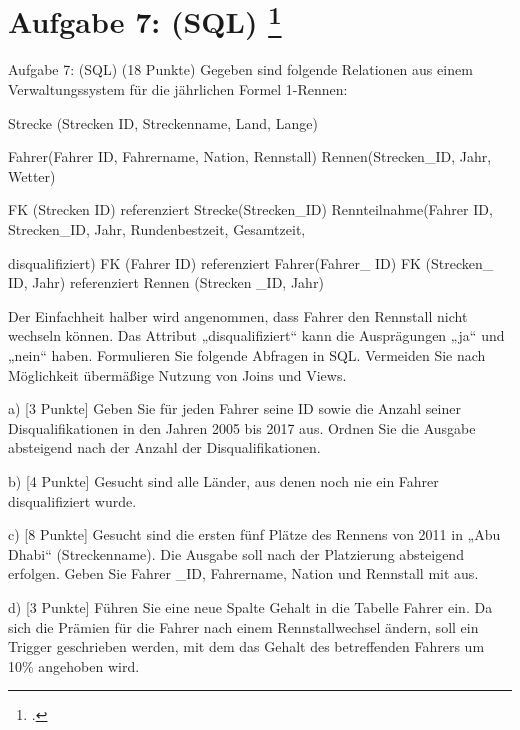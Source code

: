\documentclass{lehramt-informatik-aufgabe}
\begin{document}
\section{Aufgabe 7: (SQL)
\footcite{66116:2019:09}}

Aufgabe 7: (SQL) (18 Punkte)
Gegeben sind folgende Relationen aus einem Verwaltungssystem für die jährlichen Formel 1-Rennen:

Strecke (Strecken ID, Streckenname, Land, Lange)

Fahrer(Fahrer ID, Fahrername, Nation, Rennstall)
Rennen(Strecken\_ID, Jahr, Wetter)

FK (Strecken ID) referenziert Strecke(Strecken\_ID)
Rennteilnahme(Fahrer ID, Strecken\_ID, Jahr, Rundenbestzeit, Gesamtzeit,

disqualifiziert)
FK (Fahrer ID) referenziert Fahrer(Fahrer\_ ID)
FK (Strecken\_ ID, Jahr) referenziert Rennen (Strecken \_ID, Jahr)

Der Einfachheit halber wird angenommen, dass Fahrer den Rennstall nicht wechseln können. Das
Attribut „disqualifiziert“ kann die Ausprägungen „ja“ und „nein“ haben. Formulieren Sie folgende
Abfragen in SQL. Vermeiden Sie nach Möglichkeit übermäßige Nutzung von Joins und Views.

a) [3 Punkte] Geben Sie für jeden Fahrer seine ID sowie die Anzahl seiner Disqualifikationen in den
Jahren 2005 bis 2017 aus. Ordnen Sie die Ausgabe absteigend nach der Anzahl der
Disqualifikationen.

b) [4 Punkte] Gesucht sind alle Länder, aus denen noch nie ein Fahrer disqualifiziert wurde.

c) [8 Punkte] Gesucht sind die ersten fünf Plätze des Rennens von 2011 in „Abu Dhabi“
(Streckenname). Die Ausgabe soll nach der Platzierung absteigend erfolgen. Geben Sie Fahrer \_ID,
Fahrername, Nation und Rennstall mit aus.

d) [3 Punkte] Führen Sie eine neue Spalte Gehalt in die Tabelle Fahrer ein. Da sich die Prämien für
die Fahrer nach einem Rennstallwechsel ändern, soll ein Trigger geschrieben werden, mit dem das
Gehalt des betreffenden Fahrers um 10\% angehoben wird.
\end{document}
